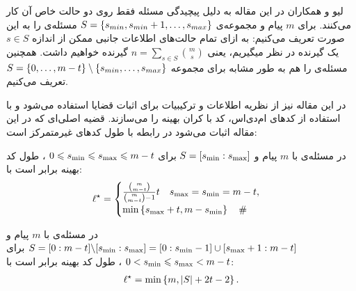 لیو و همکاران در این مقاله به دلیل پیچیدگی مسئله فقط روی دو حالت خاص آن کار می‌کنند. برای 
$m$
پیام و مجموعه‌ی
$S = \left\{ s_{min}, s_{min }+ 1, \ldots, s_{max} \right\}$
مسئله‌ی 
را به این صورت تعریف می‌کنیم: به ازای تمام حالت‌های اطلاعات جانبی ممکن از اندازه
$s \in S$
یک گیرنده در نظر میگیریم، یعنی
$n = \sum\limits_{s \in S} \binom{m}{s}$
گیرنده خواهیم داشت. همچنین مسئله‌ی
را هم به طور مشابه برای مجموعه
$S = \left\{ 0, \ldots, m - t \right\} \setminus \left\{ s_{min}, \ldots, s_{max} \right\}$
تعریف می‌کنیم.

در این مقاله نیز از نظریه اطلاعات و ترکیبیات برای اثبات قضایا استفاده می‌شود و با استفاده از کدهای ام‌دی‌اس، کد با کران بهینه را می‌سازند. قضیه اصلی‌ای که در این مقاله اثبات می‌شود در رابطه با طول کدهای غیرمتمرکز است:
\begin{theorem}[consecutive]
	\label{thm:consecutive_s}
	در مسئله‌ی
	با
	$m$ 
	پیام و
	  $S=[s_{\rm min}:s_{\rm max}]$
	  برای
	  $0\leqslant s_{\rm min} \leqslant s_{\rm max} \leqslant m-t$
	  ، طول کد بهینه برابر است با:
	\begin{align}
		\ell^{\star}=\begin{cases}
			\frac{\binom{m}{m-t}}{\binom{m}{m-t}-1}  t \quad s_{\rm max}=s_{\rm min}=m-t,\\
			\min\left\{ s_{\rm max}+t, m-s_{\rm min} \right\} \quad \#
		\end{cases}
		\label{eq:thm:consecutive_s}
	\end{align}
\end{theorem}


\begin{theorem}[complement-consecutive]
	\label{thm:complement_consecutive_s}
	در مسئله‌ی
با
 $m$ 
 پیام
 و
 $S=[0:m-t]\backslash [s_{\rm min}:s_{\rm max}] = [0:s_{\rm min}-1]\cup[s_{\rm max}+1:m-t]$
 برای
 $0 < s_{\rm min} \leqslant s_{\rm max} < m-t$
 ، طول کد بهینه برابر است با:
	\begin{align}
		\ell^{\star}=\min\left\{ m,\left|{S}\right|+2t-2 \right\}.
		\label{eq:thm:complement_consecutive_s}
	\end{align}
\end{theorem}

